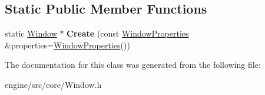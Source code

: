 \subsection*{Static Public Member Functions}
\begin{DoxyCompactItemize}
\item
\mbox{\label{classengine_1_1Window_a325de6424cfdd7fb58c05679e595008a}}
static \hyperlink{classengine_1_1Window}{Window} $\ast$ {\bfseries Create} (const \hyperlink{structengine_1_1WindowProperties}{Window\+Properties} \&properties=\hyperlink{structengine_1_1WindowProperties}{Window\+Properties}())
\end{DoxyCompactItemize}


The documentation for this class was generated from the following file\+:\begin{DoxyCompactItemize}
\item
engine/src/core/Window.\+h\end{DoxyCompactItemize}
